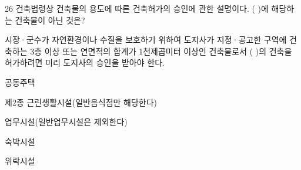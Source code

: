 \begin{question}{26}
건축법령상 건축물의 용도에 따른 건축허가의 승인에 관한 설명이다. ( )에 해당하는 건축물이 아닌 것은?
\begin{framedtext}
시장·군수가 자연환경이나 수질을 보호하기 위하여 도지사가 지정·공고한 구역에 건축하는 3층 이상 또는 연면적의 합계가 1천제곱미터 이상인 건축물로서 ( )의 건축을 허가하려면 미리 도지사의 승인을 받아야 한다. \par
\end{framedtext}
\begin{choices}
  \item 공동주택
  \item 제2종 근린생활시설(일반음식점만 해당한다)
  \item 업무시설(일반업무시설은 제외한다)
  \item 숙박시설
  \item 위락시설
\end{choices}
\end{question}
